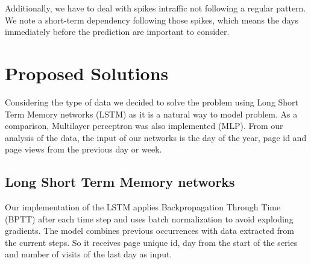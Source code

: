 \documentclass[conference]{IEEEtran}
\begin{document}
Additionally, we have to deal with spikes intraffic not following a regular pattern. We note a short-term dependency following those spikes, which means the days immediately before the prediction are important to consider.

\section{Proposed Solutions}
Considering the type of data we decided to solve the problem using Long Short Term Memory networks (LSTM) as it is a natural way to model problem. As a comparison, Multilayer perceptron was also implemented (MLP). From our analysis of the data, the input of our networks is the day of the year, page id and page views from the previous day or week.

\subsection{Long Short Term Memory networks}

Our implementation of the LSTM applies Backpropagation Through Time (BPTT) after each time step and uses batch normalization to avoid exploding gradients.
The model combines previous occurrences with data extracted from the current steps. So it receives page unique id, day from the start of the series and number of visits of the last day as input.
\end{document}
